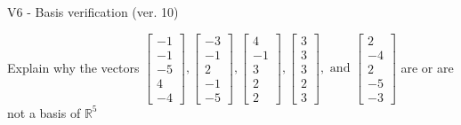\begin{exercise}
  \begin{exerciseTitle}V6 - Basis verification (ver. 10)\end{exerciseTitle}
  \begin{exerciseStatement}
    Explain why the vectors \(\left[\begin{array}{r}
-1 \\
-1 \\
-5 \\
4 \\
-4
\end{array}\right] , \left[\begin{array}{r}
-3 \\
-1 \\
2 \\
-1 \\
-5
\end{array}\right] , \left[\begin{array}{r}
4 \\
-1 \\
3 \\
2 \\
2
\end{array}\right] , \left[\begin{array}{r}
3 \\
3 \\
3 \\
2 \\
3
\end{array}\right] , \text{ and } \left[\begin{array}{r}
2 \\
-4 \\
2 \\
-5 \\
-3
\end{array}\right]\) are or are not a basis of \(\mathbb{R}^5\)	



\end{exerciseStatement}
\end{exercise}
